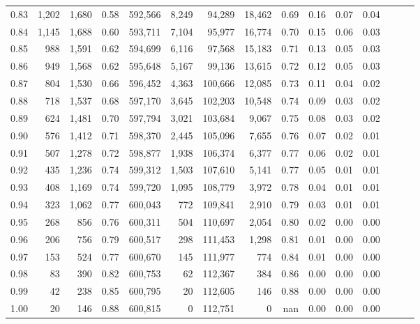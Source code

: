 \begin{tabular}{rrrrrrrrrrrrrrr}
0.83 &   1,202 &  1,680 &  0.58 &  592,566 &    8,249 &   94,289 &   18,462 &  0.69 &  0.16 &  0.07 &      0.04 \\
0.84 &   1,145 &  1,688 &  0.60 &  593,711 &    7,104 &   95,977 &   16,774 &  0.70 &  0.15 &  0.06 &      0.03 \\
0.85 &     988 &  1,591 &  0.62 &  594,699 &    6,116 &   97,568 &   15,183 &  0.71 &  0.13 &  0.05 &      0.03 \\
0.86 &     949 &  1,568 &  0.62 &  595,648 &    5,167 &   99,136 &   13,615 &  0.72 &  0.12 &  0.05 &      0.03 \\
0.87 &     804 &  1,530 &  0.66 &  596,452 &    4,363 &  100,666 &   12,085 &  0.73 &  0.11 &  0.04 &      0.02 \\
0.88 &     718 &  1,537 &  0.68 &  597,170 &    3,645 &  102,203 &   10,548 &  0.74 &  0.09 &  0.03 &      0.02 \\
0.89 &     624 &  1,481 &  0.70 &  597,794 &    3,021 &  103,684 &    9,067 &  0.75 &  0.08 &  0.03 &      0.02 \\
0.90 &     576 &  1,412 &  0.71 &  598,370 &    2,445 &  105,096 &    7,655 &  0.76 &  0.07 &  0.02 &      0.01 \\
0.91 &     507 &  1,278 &  0.72 &  598,877 &    1,938 &  106,374 &    6,377 &  0.77 &  0.06 &  0.02 &      0.01 \\
0.92 &     435 &  1,236 &  0.74 &  599,312 &    1,503 &  107,610 &    5,141 &  0.77 &  0.05 &  0.01 &      0.01 \\
0.93 &     408 &  1,169 &  0.74 &  599,720 &    1,095 &  108,779 &    3,972 &  0.78 &  0.04 &  0.01 &      0.01 \\
0.94 &     323 &  1,062 &  0.77 &  600,043 &      772 &  109,841 &    2,910 &  0.79 &  0.03 &  0.01 &      0.01 \\
0.95 &     268 &    856 &  0.76 &  600,311 &      504 &  110,697 &    2,054 &  0.80 &  0.02 &  0.00 &      0.00 \\
0.96 &     206 &    756 &  0.79 &  600,517 &      298 &  111,453 &    1,298 &  0.81 &  0.01 &  0.00 &      0.00 \\
0.97 &     153 &    524 &  0.77 &  600,670 &      145 &  111,977 &      774 &  0.84 &  0.01 &  0.00 &      0.00 \\
0.98 &      83 &    390 &  0.82 &  600,753 &       62 &  112,367 &      384 &  0.86 &  0.00 &  0.00 &      0.00 \\
0.99 &      42 &    238 &  0.85 &  600,795 &       20 &  112,605 &      146 &  0.88 &  0.00 &  0.00 &      0.00 \\
1.00 &      20 &    146 &  0.88 &  600,815 &        0 &  112,751 &        0 &   nan &  0.00 &  0.00 &      0.00 \\
\bottomrule
\end{tabular}
